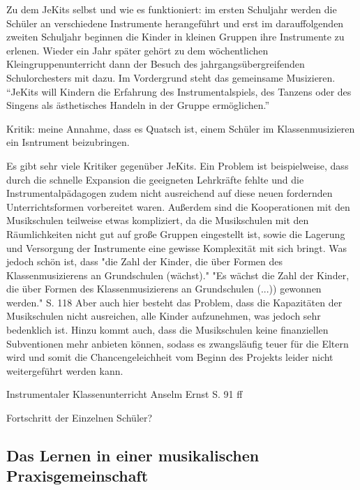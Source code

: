 Zu dem JeKits selbst und wie es funktioniert: im ersten Schuljahr werden die
Schüler an verschiedene Instrumente herangeführt und erst im darauffolgenden
zweiten Schuljahr beginnen die Kinder in kleinen Gruppen ihre Instrumente zu
erlenen. Wieder ein Jahr später gehört zu dem wöchentlichen
Kleingruppenunterricht dann der Besuch des jahrgangsübergreifenden
Schulorchesters mit dazu. Im Vordergrund steht das gemeinsame Musizieren.
\enquote{JeKits will Kindern die Erfahrung des Instrumentalspiels, des Tanzens
oder des Singens als ästhetisches Handeln in der Gruppe ermöglichen.}



Kritik:
meine Annahme, dass es Quatsch ist, einem Schüler im Klassenmusizieren
ein Isntrument beizubringen.

Es gibt sehr viele Kritiker gegenüber JeKits. Ein Problem ist beispielweise,
dass durch die schnelle Expansion die geeigneten Lehrkräfte fehlte und die
Instrumentalpädagogen zudem nicht ausreichend auf diese neuen fordernden
Unterrichtsformen vorbereitet waren. Außerdem sind die Kooperationen mit den
Musikschulen teilweise etwas kompliziert, da die Musikschulen mit den
Räumlichkeiten nicht gut auf große Gruppen eingestellt ist, sowie die Lagerung
und Versorgung der Instrumente eine gewisse Komplexität mit sich bringt. Was
jedoch schön ist, dass "die Zahl der Kinder, die über Formen des
Klassenmusizierens an Grundschulen (wächst)." "Es wächst die Zahl der Kinder,
die über Formen des Klassenmusizierens an Grundschulen (...)) gewonnen werden."
S. 118 Aber auch hier besteht das Problem, dass die Kapazitäten der Musikschulen
nicht ausreichen, alle Kinder aufzunehmen, was jedoch sehr bedenklich ist. Hinzu
kommt auch, dass die Musikschulen keine finanziellen Subventionen mehr anbieten
können, sodass es zwangsläufig teuer für die Eltern wird und somit die
Chancengeleichheit vom Beginn des Projekts leider nicht weitergeführt werden
kann.

Instrumentaler Klassenunterricht
Anselm Ernst S. 91 ff

Fortschritt der Einzelnen Schüler?



\subsection{Das Lernen in einer musikalischen Praxisgemeinschaft}
